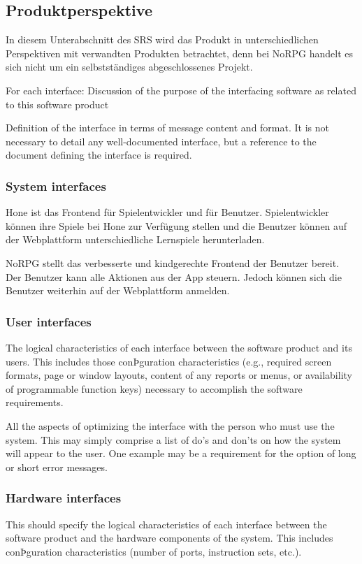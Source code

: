 	\subsection{Produktperspektive}
		In diesem Unterabschnitt des SRS wird das Produkt in unterschiedlichen Perspektiven mit verwandten Produkten betrachtet, denn bei NoRPG handelt es sich nicht um ein selbstständiges abgeschlossenes Projekt.
		
		For each interface:
		Discussion of the purpose of the interfacing software as related to this software product
		
		Definition of the interface in terms of message content and format. It is not necessary to detail any well-documented interface, but a reference to the document defining the interface is required.
		
		\subsubsection{System interfaces}
			Hone ist das Frontend für Spielentwickler und für Benutzer. Spielentwickler können ihre Spiele bei Hone zur Verfügung stellen und die Benutzer können auf der Webplattform unterschiedliche Lernspiele herunterladen.
		
			NoRPG stellt das verbesserte und kindgerechte Frontend der Benutzer bereit. Der Benutzer kann alle Aktionen aus der App steuern. Jedoch können sich die Benutzer weiterhin auf der Webplattform anmelden. 
		
		\subsubsection{User interfaces}
			The logical characteristics of each interface between the software product and its users. This includes those conÞguration characteristics (e.g., required screen formats, page or window layouts, content of any reports or menus, or availability of programmable function keys) necessary to accomplish the software requirements.
			
			All the aspects of optimizing the interface with the person who must use the system. This may simply comprise a list of do's and don'ts on how the system will appear to the user. One example may be a requirement for the option of long or short error messages.
		
		\subsubsection{Hardware interfaces}
			This should specify the logical characteristics of each interface between the software product and the hardware components of the system. This includes conÞguration characteristics (number of ports, instruction sets, etc.).
			
